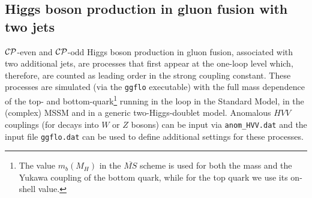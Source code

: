 \documentclass[english,12pt]{article}
\begin{document}
\subsection{Higgs boson production in gluon fusion with two jets}

%
$\cal{CP}$-even and $\cal{CP}$-odd Higgs boson production in gluon fusion,
associated with two additional jets, are processes that first appear at the
one-loop level which, therefore, are counted as leading order in the strong
coupling constant. These processes are simulated (via the {\tt ggflo} executable) with the
full mass dependence of the top- and bottom-quark\footnote{The value
$m_{b}(M_{H})$ in the $\overline{MS}$ scheme is used for both the mass
and the Yukawa coupling of the bottom quark, while for the top quark we
use its on-shell value.} running in the loop in the Standard Model, in
the (complex) MSSM and in a generic two-Higgs-doublet model.  Anomalous
$HVV$ couplings (for decays into $W$ or $Z$ bosons) can be input via
{\tt anom\_HVV.dat} and the input file {\tt ggflo.dat} can be used to
define additional settings for these processes.
%
\end{document}
